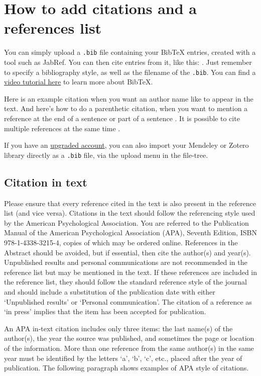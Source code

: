 \section{How to add citations and a references list}

You can simply upload a \verb|.bib| file containing your BibTeX entries, created with a tool such as JabRef. You can then cite entries from it, like this: \textcite{greenwade93}. Just remember to specify a bibliography style, as well as the filename of the \verb|.bib|. You can find a \href{https://www.overleaf.com/help/97-how-to-include-a-bibliography-using-bibtex}{video tutorial here} to learn more about BibTeX.

Here is an example citation when you want an author name like \textcite{collins2011a} to appear in the text. And here's how to do a parenthetic citation, when you want to mention a reference at the end of a sentence or part of a sentence \parencite{collins2013}. It is possible to cite multiple references at the same time \parencite{collins2011b,collins2016,lunn2007a,lunn2007b,ross2006,shannon1948}.

If you have an \href{https://www.overleaf.com/user/subscription/plans}{upgraded account}, you can also import your Mendeley or Zotero library directly as a \verb|.bib| file, via the upload menu in the file-tree.

\subsection{Citation in text}
Please ensure that every reference cited in the text is also present in the reference list (and vice versa). Citations in the text should follow the referencing style used by the American Psychological Association. You are referred to the Publication Manual of the American Psychological Association (APA), Seventh Edition, ISBN 978-1-4338-3215-4, copies of which may be ordered online. References in the Abstract should be avoided, but if essential, then cite the author(s) and year(s). Unpublished results and personal communications are not recommended in the reference list but may be mentioned in the text. If these references are included in the reference list, they should follow the standard reference style of the journal and should include a substitution of the publication date with either ‘Unpublished results’ or ‘Personal communication’. The citation of a reference as ‘in press’ implies that the item has been accepted for publication. 

An APA in-text citation includes only three items: the last name(s) of the author(s), the year the source was published, and sometimes the page or location of the information. More than one reference from the same author(s) in the same year must be identified by the letters ‘a’, ‘b’, ‘c’, etc., placed after the year of publication. The following paragraph shows examples of APA style of citations.

